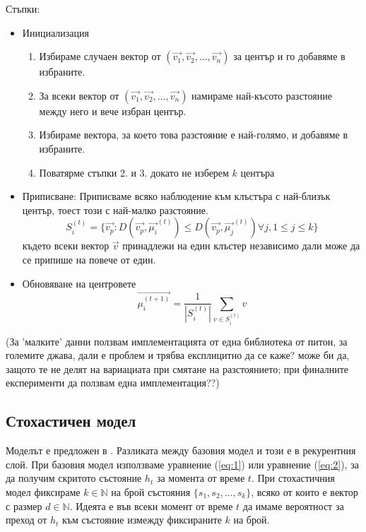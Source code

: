 \documentclass[a4paper,12pt]{article}
\begin{document}
Стъпки:
\begin{itemize}
\item Инициализация
    \begin{enumerate}
    \item Избираме случаен вектор от $(\vec{v_1}, \vec{v_2},\ldots, \vec{v_n})$ за център и го добавяме в избраните.
    \item За всеки вектор от $(\vec{v_1}, \vec{v_2},\ldots, \vec{v_n})$ намираме най-късото разстояние между него и вече избран център.
    \item Избираме вектора, за което това разстояние е най-голямо, и добавяме в избраните.
    \item Поватярме стъпки 2. и 3. докато не изберем $k$ центъра
    \end{enumerate}
\item Приписване:
Приписваме всяко наблюдение към клъстъра с най-близък център, тоест този с най-малко разстояние.
\begin{equation}
S_i^{(t)} = \{\vec{v_p}: D(\vec{v_p}, {\vec{\mu_i}}^{(t)}) \leq D(\vec{v_p}, {\vec{\mu_j}}^{(t)}) \forall j, 1 \leq j \leq k\}
\end{equation}
където всеки вектор $\vec{v}$ принадлежи на един клъстер независимо дали може да се припише на повече от един.
\item Обновяване на центровете
\begin{equation}
\vec{\mu_i^{(t+1)}} = \frac{1}{|S_i^{(t)}|} \sum_{v \in S_i^{(t)}}{v}
\end{equation}
\end{itemize}

(За 'малките' данни ползвам имплементацията от една библиотека от питон, за големите джава, дали е проблем и трябва експлицитно да се каже? може би да, защото те не делят на вариациата при смятане на разстоянието; при финалните експерименти да ползвам една имплементация??)

\subsection{Стохастичен модел}

Моделът е предложен в \cite{citation06}. Разликата между базовия модел и този е в рекурентния слой. При базовия модел използваме уравнение (\ref{eq:1}) или уравнение (\ref{eq:2}), за да получим скритото състояние $h_t$ за момента от време $t$. При стохастичния модел фиксираме $k \in \mathbb{N}$ на брой състояния $\{s_1, s_2, \ldots, s_k\}$, всяко от които е вектор с размер $d \in \mathbb{N}$. Идеята е във всеки момент от време $t$ да имаме вероятност за преход от $h_t$ към състояние измежду фиксираните $k$ на брой. 
\end{document}
